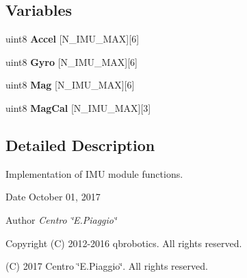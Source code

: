 \subsection*{Variables}
\begin{DoxyCompactItemize}
\item 
\mbox{\label{_i_m_u__functions_8c_a187c605f3898cf11e09f6f469c265920}} 
uint8 {\bfseries Accel} [N\+\_\+\+I\+M\+U\+\_\+\+M\+AX][6]
\item 
\mbox{\label{_i_m_u__functions_8c_a49dba88a31d1b3b4190065b9ef1649fe}} 
uint8 {\bfseries Gyro} [N\+\_\+\+I\+M\+U\+\_\+\+M\+AX][6]
\item 
\mbox{\label{_i_m_u__functions_8c_a5d88408ccb73729f049a52b4d1daaadf}} 
uint8 {\bfseries Mag} [N\+\_\+\+I\+M\+U\+\_\+\+M\+AX][6]
\item 
\mbox{\label{_i_m_u__functions_8c_a1e598e1bdae5fe927fbd1f396161f3a6}} 
uint8 {\bfseries Mag\+Cal} [N\+\_\+\+I\+M\+U\+\_\+\+M\+AX][3]
\end{DoxyCompactItemize}


\subsection{Detailed Description}
Implementation of I\+MU module functions. 

\begin{DoxyDate}{Date}
October 01, 2017 
\end{DoxyDate}
\begin{DoxyAuthor}{Author}
{\itshape Centro \char`\"{}\+E.\+Piaggio\char`\"{}} 
\end{DoxyAuthor}
\begin{DoxyCopyright}{Copyright}
(C) 2012-\/2016 qbrobotics. All rights reserved. 

(C) 2017 Centro \char`\"{}\+E.\+Piaggio\char`\"{}. All rights reserved. 
\end{DoxyCopyright}
